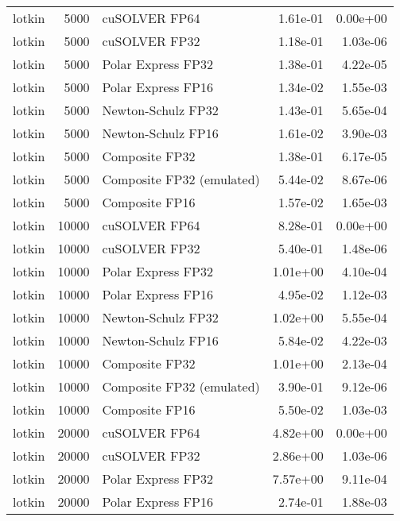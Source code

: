 \begin{table}
\begin{tabular}{lrlrr}
   lotkin &  5000 &             cuSOLVER FP64 &  1.61e-01 &        0.00e+00 \\
   lotkin &  5000 &             cuSOLVER FP32 &  1.18e-01 &        1.03e-06 \\
   lotkin &  5000 &        Polar Express FP32 &  1.38e-01 &        4.22e-05 \\
   lotkin &  5000 &        Polar Express FP16 &  1.34e-02 &        1.55e-03 \\
   lotkin &  5000 &        Newton-Schulz FP32 &  1.43e-01 &        5.65e-04 \\
   lotkin &  5000 &        Newton-Schulz FP16 &  1.61e-02 &        3.90e-03 \\
   lotkin &  5000 &            Composite FP32 &  1.38e-01 &        6.17e-05 \\
   lotkin &  5000 & Composite FP32 (emulated) &  5.44e-02 &        8.67e-06 \\
   lotkin &  5000 &            Composite FP16 &  1.57e-02 &        1.65e-03 \\
   lotkin & 10000 &             cuSOLVER FP64 &  8.28e-01 &        0.00e+00 \\
   lotkin & 10000 &             cuSOLVER FP32 &  5.40e-01 &        1.48e-06 \\
   lotkin & 10000 &        Polar Express FP32 &  1.01e+00 &        4.10e-04 \\
   lotkin & 10000 &        Polar Express FP16 &  4.95e-02 &        1.12e-03 \\
   lotkin & 10000 &        Newton-Schulz FP32 &  1.02e+00 &        5.55e-04 \\
   lotkin & 10000 &        Newton-Schulz FP16 &  5.84e-02 &        4.22e-03 \\
   lotkin & 10000 &            Composite FP32 &  1.01e+00 &        2.13e-04 \\
   lotkin & 10000 & Composite FP32 (emulated) &  3.90e-01 &        9.12e-06 \\
   lotkin & 10000 &            Composite FP16 &  5.50e-02 &        1.03e-03 \\
   lotkin & 20000 &             cuSOLVER FP64 &  4.82e+00 &        0.00e+00 \\
   lotkin & 20000 &             cuSOLVER FP32 &  2.86e+00 &        1.03e-06 \\
   lotkin & 20000 &        Polar Express FP32 &  7.57e+00 &        9.11e-04 \\
   lotkin & 20000 &        Polar Express FP16 &  2.74e-01 &        1.88e-03 \\

\end{tabular}
\end{table}
